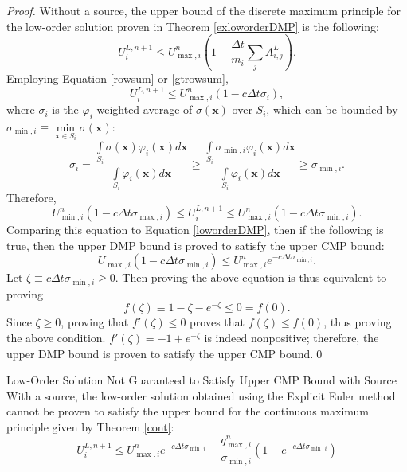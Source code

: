 \begin{proof}
Without a source, the upper bound of the discrete maximum principle for the low-order solution
proven in Theorem \ref{exloworderDMP} is the following:
\[
   U_i^{L,n+1}\leq
   U_{\max,i}^n\left(1-\frac{\Delta t}{m_i}\sum\limits_j A^L_{i,j}\right).
\]
Employing Equation \eqref{rowsum} or \eqref{gtrowsum},
\[
   U_i^{L,n+1} \le
   U_{\max,i}^n(1-c\Delta t\sigma_i),
\]
where $\sigma_i$ is the $\varphi_i$-weighted average of $\sigma(\mathbf{x})$ over
$S_i$, which can be bounded by
$\sigma_{\min,i}\equiv\min\limits_{\mathbf{x}\in S_i}\sigma(\mathbf{x})$:
\[
   \sigma_i = \frac{\int\limits_{S_i}\sigma(\mathbf{x})\varphi_i(\mathbf{x})d\mathbf{x}}{\int\limits_{S_i}\varphi_i(\mathbf{x})d\mathbf{x}}
   \ge \frac{\int\limits_{S_i}\sigma_{\min,i}\varphi_i(\mathbf{x})d\mathbf{x}}{\int\limits_{S_i}\varphi_i(\mathbf{x})d\mathbf{x}}
   \ge \sigma_{\min,i}.
\]
Therefore,
\[
   U_{\min,i}^n(1-c\Delta t\sigma_{\max,i}) \le
   U_i^{L,n+1} \le
   U_{\max,i}^n(1-c\Delta t\sigma_{\min,i}).
\]
Comparing this equation to Equation \eqref{loworderDMP}, then if the following is true,
then the upper DMP bound is proved to satisfy the upper CMP bound:
\[
   U_{\max,i}(1-c\Delta t\sigma_{\min,i}) \le U_{\max,i}^n e^{-c\Delta t\sigma_{\min,i}}.
\]
Let $\zeta\equiv c\Delta t\sigma_{\min,i}\ge 0$. Then proving the above equation is
thus equivalent to proving
\[
   f(\zeta)\equiv 1-\zeta-e^{-\zeta} \le 0 = f(0).
\]
Since $\zeta\ge 0$, proving that $f'(\zeta)\le 0$ proves that $f(\zeta)\le f(0)$, thus
proving the above condition. $f'(\zeta)=-1+e^{-\zeta}$ is indeed nonpositive; therefore,
the upper DMP bound is proven to satisfy the upper CMP bound.\qed
\end{proof}
\begin{corollary}{Low-Order Solution Not Guaranteed to Satisfy Upper CMP Bound with Source}
   With a source, the low-order solution obtained using the Explicit Euler
   method cannot be proven to satisfy the upper bound
   for the continuous maximum principle given by Theorem \ref{cont}:
   \[
      U_i^{L,n+1} \le
      U_{\max,i}^n e^{-c\Delta t\sigma_{\min,i}}
      + \frac{q_{\max,i}^n}{\sigma_{\min,i}}(1-e^{-c\Delta t\sigma_{\min,i}})
   \]
\end{corollary}

